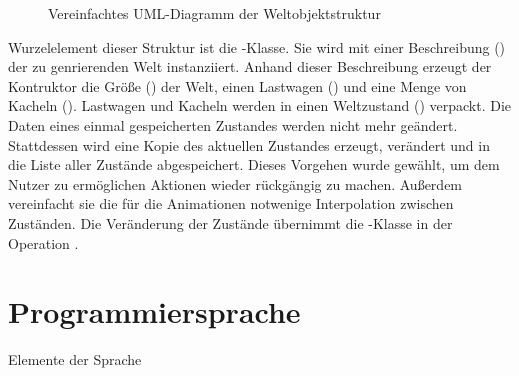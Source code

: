 \begin{figure}[h]
  \caption{Vereinfachtes UML-Diagramm der Weltobjektstruktur}
  \label{fig:implementation:program:uml}
\end{figure}

Wurzelelement dieser Struktur ist die -Klasse. Sie wird mit einer Beschreibung () der zu genrierenden Welt instanziiert. Anhand dieser Beschreibung erzeugt der Kontruktor die Größe () der Welt, einen Lastwagen () und eine Menge von Kacheln (). Lastwagen und Kacheln werden in einen Weltzustand () verpackt. Die Daten eines einmal gespeicherten Zustandes werden nicht mehr geändert. Stattdessen wird eine Kopie des aktuellen Zustandes erzeugt, verändert und in die Liste aller Zustände abgespeichert. Dieses Vorgehen wurde gewählt, um dem Nutzer zu ermöglichen Aktionen wieder rückgängig zu machen. Außerdem vereinfacht sie die für die Animationen  notwenige Interpolation zwischen Zuständen. Die Veränderung der Zustände übernimmt die -Klasse in der Operation .

\section{Programmiersprache}

Elemente der Sprache

